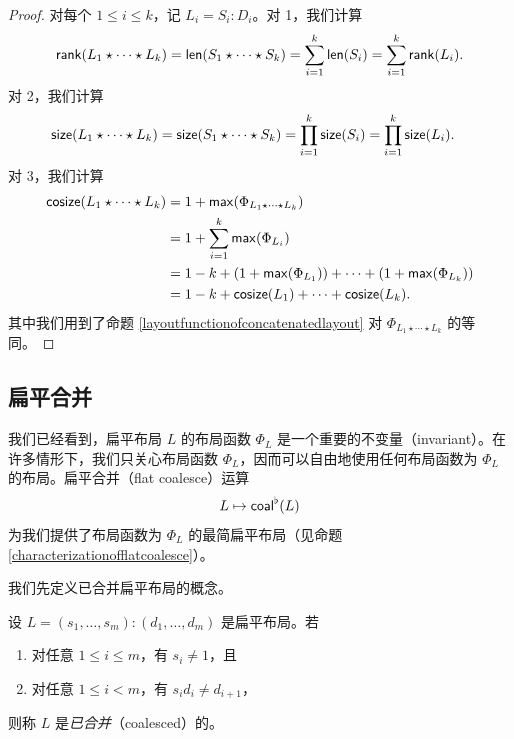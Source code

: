 \begin{proof}
    对每个 $1 \leq i \leq k$，记 $L_i = S_i:D_i$。对 1，我们计算
    \begin{align*}
        \mathsf{rank}(L_1 \star \cdots \star L_k) & = \mathsf{len}(S_1 \star \cdots \star S_k) = \sum_{i=1}^k \mathsf{len}(S_i) = \sum_{i=1}^k \mathsf{rank}(L_i).\\
    \end{align*}
    对 2，我们计算
    \begin{align*}
        \mathsf{size}(L_1 \star \cdots \star L_k) & = \mathsf{size}(S_1 \star \cdots \star S_k) = \prod_{i=1}^k \mathsf{size}(S_i) = \prod_{i=1}^k \mathsf{size}(L_i).
    \end{align*}
    对 3，我们计算
    \begin{align*}
    \mathsf{cosize}(L_1 \star \cdots \star L_k)  & = 1 + \mathsf{max}(\Phi_{L_1 \star \cdots \star L_k})\\
    & = 1 + \sum_{i=1}^k\mathsf{max}(\Phi_{L_i})\\
    & = 1 - k + \left( 1 + \mathsf{max}(\Phi_{L_1}) \right) + \cdots + \left( 1 + \mathsf{max}(\Phi_{L_k}) \right)\\
    & = 1 - k + \mathsf{cosize}(L_1) + \cdots + \mathsf{cosize}(L_k).
    \end{align*}
    其中我们用到了命题 \ref{layoutfunctionofconcatenatedlayout} 对 $\Phi_{L_1 \star \cdots \star L_k}$ 的等同。
\end{proof}



\subsection{扁平合并}
我们已经看到，扁平布局 $L$ 的布局函数 $\Phi_L$ 是一个重要的不变量（invariant）。在许多情形下，我们只关心布局函数 $\Phi_L$，因而可以自由地使用任何布局函数为 $\Phi_L$ 的布局。扁平合并（flat coalesce）运算
\[L \mapsto \mathsf{coal}^\flat(L)\]
为我们提供了布局函数为 $\Phi_L$ 的最简扁平布局（见命题 \ref{characterizationofflatcoalesce}）。

我们先定义已合并扁平布局的概念。
\begin{definition} \label{definitionofflatlayoutcoalesce}
设 $L = (s_1,\dots,s_m):(d_1,\dots,d_m)$ 是扁平布局。若
\begin{enumerate}
    \item 对任意 $1 \leq i \leq m$，有 $s_i \neq 1$，且
    \item 对任意 $1 \leq i <m$，有 $s_id_i \neq d_{i+1}$，
\end{enumerate}
则称 $L$ 是{\it 已合并}（coalesced）的。
\end{definition}

